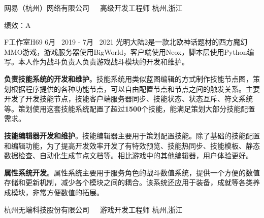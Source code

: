 \begin{cventries}
\cventrycompany
{网易（杭州）网络有限公司~~~高级开发工程师} %
{杭州,浙江} %

\cventrycompany
{绩效：A} %
{~} %

\cventryproject
{F工作室H69} %
{6月~ 2019 - 7月~ 2021} %
{光明大陆2是一款北欧神话题材的西方魔幻MMO游戏，游戏服务器使用BigWorld，客户端使用Neox，脚本层使用Python编写。本人作为战斗负责人负责游戏战斗模块的开发和维护。}
{ %
	\begin{cvitems}
		\item {\textbf{负责技能系统的开发和维护}。技能系统用类似蓝图编辑的方式制作技能节点图，策划根据程序提供的各种功能节点，可以自由配置节点和节点之间的触发关系。主要开发了开发技能节点，技能客户端服务器同步、技能状态、状态互斥、符文系统等。策划使用这套技能系统配置了超过\textbf{1500}个技能，能满足策划大部分技能配置需求。}
		\item{\textbf{技能编辑器开发和维护}。技能编辑器主要用于策划配置技能。除了基础的技能配置和编辑功能，为了提高开发效率开发了有特效预览、技能热同步、技能模板、静态数据检查、自动化生成节点文档等。相比游戏中的其他编辑器，用户体验更好。}
		\item{\textbf{属性系统开发}。属性系统主要用于服务角色的战斗数值系统，提供一个方便的数值存储和更新机制，减少各个模块之间的耦合。该系统还应用于装备，成就等各类养成模块，非常方便数值的拓展。}
	\end{cvitems}
}



\cventrycompany
{杭州无端科技股份有限公司~~~游戏开发工程师} %
{杭州,浙江} %


\end{cventries}
